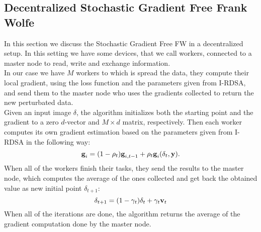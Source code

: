 \subsection{Decentralized Stochastic Gradient Free Frank Wolfe}
In this section we discuss the Stochastic Gradient Free FW in a decentralized setup. In this setting we have some devices, that we call workers, connected to a master node to read, write and exchange information.\\
In our case we have $M$ workers to which is spread the data, they compute their local gradient, using the loss function and the parameters given from I-RDSA, and send them to the master node who uses the gradients collected to return the new perturbated data.\\
Given an input image \boldmath$\delta$, the algorithm initializes both the starting point and the gradient to a zero $d$-vector and $M \times d$ matrix, respectively. Then each worker computes its own gradient estimation based on the parameters given from I-RDSA in the following way:
\[\textbf{g}_i= (1- \rho_t)\textbf{g}_{i,t-1} + \rho_t\textbf{g}_i(\text{\boldmath}\delta_t,\textbf{y}).\]
 When all of the workers finish their tasks, they send the results to the master node, which computes the average of the ones collected and get back the obtained value as new initial point \boldmath$\delta_{t+1}$:
\[\text{\boldmath}\delta_{t+1} = (1-\gamma_t)\text{\boldmath}\delta_t + \gamma_t\textbf{v}_t \]
 When all of the iterations are done, the algorithm returns the average of the gradient computation done by the master node.

